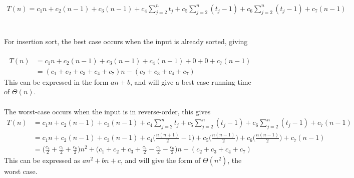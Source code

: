 \documentclass{article}
\begin{document}
\\
\begin{multline*}
T(n) = c_1n + c_2(n-1) + c_3(n-1) + c_4\sum_{j=2}^{n} t_j + c_5\sum_{j=2}^{n} (t_j-1) + c_6\sum_{j=2}^{n} (t_j-1) + c_7(n-1)
\end{multline*}
\\
\\
For insertion sort, the best case occurs when the input is already sorted, giving
\\
\\
\begin{equation*}
\begin{split}
T(n) & = c_1n + c_2(n-1) + c_3(n-1) + c_4(n-1) + 0 + 0 + c_7(n-1) \\
  & = (c_1 + c_2 + c_3 + c_4 + c_7)n - (c_2 + c_3 + c_4 + c_7)
\end{split}
\end{equation*}
This can be expressed in the form $an + b$, and will give a best case running time of $\Theta(n)$.
\\
\\
The worst-case occurs when the input is in reverse-order, this gives
\begin{equation*}
\begin{split}
T(n) & = c_1n + c_2(n-1) + c_3(n-1) + c_4\sum_{j=2}^{n} t_j + c_5\sum_{j=2}^{n} (t_j-1) + c_6\sum_{j=2}^{n} (t_j-1) + c_7(n-1) \\
  & = c_1n + c_2(n-1) + c_3(n-1) + c_4\bigg(\frac{n(n+1)}{2} - 1 \bigg) + c_5\bigg(\frac{n(n-1)}{2}\bigg) + c_6\bigg(\frac{n(n-1)}{2}\bigg) + c_7(n-1) \\
  & = \bigg(\frac{c_4}{2} + \frac{c_5}{2} + \frac{c_6}{2}\bigg)n^2 + \bigg(c_1 + c_2 + c_3 + \frac{c_4}{2} - \frac{c_5}{2} - \frac{c_6}{2}\bigg)n - (c_2 + c_3 + c_4 + c_7)
\end{split}
\end{equation*}
This can be expressed as $an^2 + bn + c$, and will give the form of $\Theta(n^2)$, the worst case.
\end{document}

